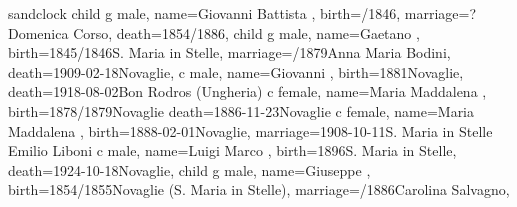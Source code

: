 \documentclass{article}
\begin{document}
\begin{midpage}
\begin{center}

\begin{genealogypicture}[
    processing=database,
    database format=full,
    node size=3.8cm,
    level size=2.8cm,
    level distance=6mm,
    list separators hang=3mm,
    name font=\bfseries,
    surn code={\textcolor{black!50!black}{#1}},
    place text={\newline}{},
    date format=d month yyyy,
    tcbset={male/.style={colframe=blue,colback=blue!5},
    female/.style={colframe=red,colback=red!5}},
    box={fit basedim=7pt,boxsep=2pt,segmentation style=solid,
        halign=left,before upper=\parskip1pt,
        \gtrDBsex,
    },
    options for family={LuigiFam}{extra edges={Carolina,Luigi}{Elisabetta1,Elisabetta2}{}},
    options for family={Elisabetta1Fam}{extra edges={Albino,Elisabetta1}{}{}},
]
sandclock
{
    child{
        g{
            male,
            name={Giovanni Battista },
            birth={/1846}{},
            marriage={?}{Domenica Corso},
            death={1854/1886}{},
        }
        child{
            g{
                male,
                name={Gaetano },
                birth={1845/1846}{S. Maria in Stelle},
                marriage={/1879}{Anna Maria Bodini},
                death={1909-02-18}{Novaglie},
            }
            c{
                male,
                name={Giovanni },
                birth={1881}{Novaglie},
                death={1918-08-02}{Bon Rodros (Ungheria)}
            }
            c{
                female,
                name={Maria Maddalena },
                birth={1878/1879}{Novaglie}
                death={1886-11-23}{Novaglie}
            }
            c{
                female,
                name={Maria Maddalena },
                birth={1888-02-01}{Novaglie},
                marriage={1908-10-11}{S. Maria in Stelle \newline Emilio Liboni}
            }
            c{
                male,
                name={Luigi Marco },
                birth={1896}{S. Maria in Stelle},
                death={1924-10-18}{Novaglie},
            }
        }
        child{
            g{
                male,
                name={Giuseppe },
                birth={1854/1855}{Novaglie (S. Maria in Stelle)},
                marriage={/1886}{Carolina Salvagno},
}}}}
\end{genealogypicture}
\end{center}
\end{midpage}
\end{document}

